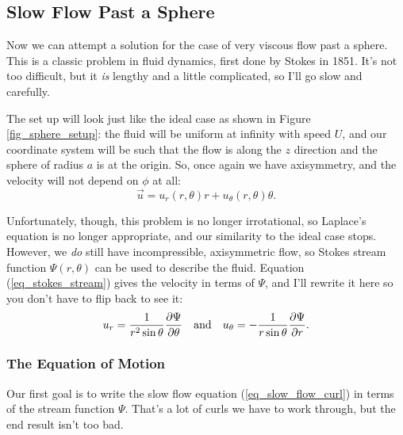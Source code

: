 \subsection{Slow Flow Past a Sphere}

Now we can attempt a solution for the case of very viscous flow past a sphere.  This is a classic problem in fluid dynamics, first done by Stokes in 1851.  It's not too difficult, but it \emph{is} lengthy and a little complicated, so I'll go slow and carefully.

The set up will look just like the ideal case as shown in Figure \ref{fig_sphere_setup}: the fluid will be uniform at infinity with speed $U$, and our coordinate system will be such that the flow is along the $z$ direction and the sphere of radius $a$ is at the origin.  So, once again we have axisymmetry, and the velocity will not depend on $\phi$ at all:
\[
\vec{u} = u_r(r, \theta) \unit{r} + u_\theta(r, \theta) \unit{\theta}.
\]

Unfortunately, though, this problem is no longer irrotational, so Laplace's equation is no longer appropriate, and our similarity to the ideal case stops.  However, we \emph{do} still have incompressible, axisymmetric flow, so Stokes stream function $\Psi(r, \theta)$ can be used to describe the fluid.  Equation (\ref{eq_stokes_stream}) gives the velocity in terms of $\Psi$, and I'll rewrite it here so you don't have to flip back to see it:
\[
u_r = \frac{1}{r^2 \sin \theta} \frac{\partial {\Psi}}{\partial {\theta}} \quad \text{and} \quad u_\theta = -\frac{1}{r \sin \theta} \frac{\partial {\Psi}}{\partial {r}}.
\]

\subsubsection{The Equation of Motion}

Our first goal is to write the slow flow equation (\ref{eq_slow_flow_curl}) in terms of the stream function $\Psi$.  That's a lot of curls we have to work through, but the end result isn't too bad.


